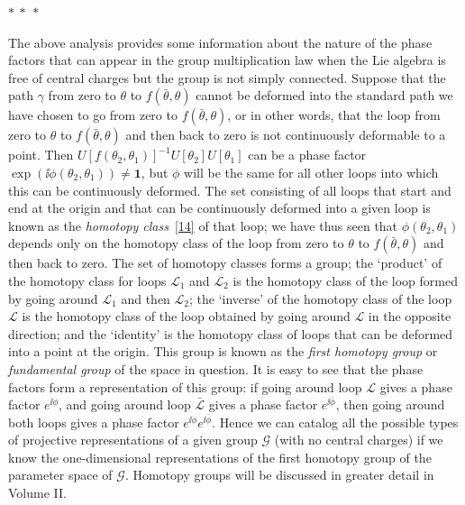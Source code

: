 \begin{center}
$*\ *\ *$
\end{center}

The above analysis provides some information about the nature of the phase
factors that can appear in the group multiplication law when the Lie
algebra is free of central charges but the group is not simply connected.
Suppose that the path $\gamma$ from zero to $\theta$ to
$f(\bar\theta,\theta)$ cannot be deformed into the standard path we have
chosen to go from zero to $f(\bar\theta,\theta)$, or in other words, that
the loop from zero to $\theta$ to $f(\bar\theta,\theta)$ and then back to
zero is not continuously deformable to a point. Then
$U[f(\theta_2,\theta_1)]^{-1}U[\theta_2]U[\theta_1]$ can be a phase factor
$\exp(\ii\phi(\theta_2,\theta_1))\neq\mathbf{1}$, but $\phi$ will be the same
for all other loops into which this can be continuously deformed. The set
consisting of all loops that start and end at the origin and that can be
continuously deformed into a given loop is known as the \emph{homotopy
class}~\hyperref[ref:2.14]{[14]} of that loop; we have thus seen that
$\phi(\theta_2,\theta_1)$ depends only on the homotopy class of the loop
from zero to $\theta$ to $f(\bar\theta,\theta)$ and then back to zero. The
set of homotopy classes forms a group; the `product' of the homotopy class
for loops $\mathcal{L}_1$ and $\mathcal{L}_2$ is the homotopy class of the
loop formed by going around $\mathcal{L}_1$ and then $\mathcal{L}_2$; the
`inverse' of the homotopy class of the loop $\mathcal{L}$ is the homotopy
class of the loop obtained by going around $\mathcal{L}$ in the opposite
direction; and the `identity' is the homotopy class of loops that can be
deformed into a point at the origin. This group is known as the
\emph{first homotopy group} or \emph{fundamental group} of the space in
question. It is easy to see that the phase factors form a representation
of this group: if going around loop $\mathcal{L}$ gives a phase factor
$e^{\ii\phi}$, and going around loop $\bar{\mathcal{L}}$ gives a phase factor
$e^{\ii\bar\phi}$, then going around both loops gives a phase factor
$e^{\ii\phi}e^{\ii\bar\phi}$. Hence we can catalog all the possible types of
projective representations of a given group $\mathcal{G}$ (with no central
charges) if we know the one-dimensional representations of the first
homotopy group of the parameter space of $\mathcal{G}$. Homotopy groups
will be discussed in greater detail in Volume II.
